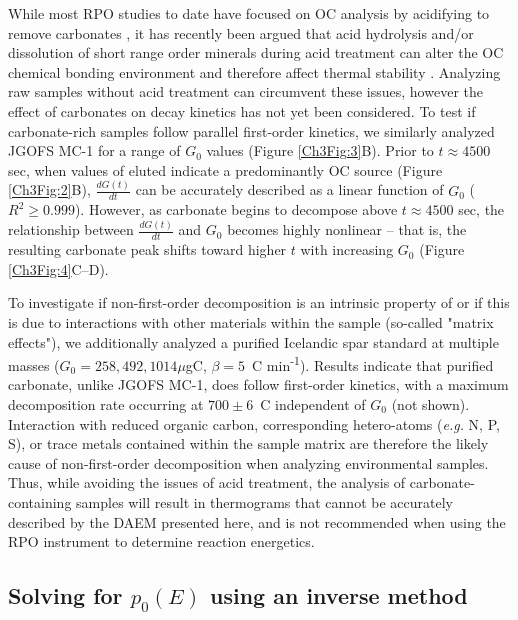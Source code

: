 While most RPO studies to date have focused on OC analysis by acidifying to remove carbonates \citep[\textit{e.g.}][]{Rosenheim:2008ed,Rosenheim:2012kh,Rosenheim:2013dka,Schreiner:2014jr,Bianchi:2015jr}, it has recently been argued that acid hydrolysis and/or dissolution of short range order minerals during acid treatment can alter the OC chemical bonding environment and therefore affect thermal stability \citep{Plante:2013tu}. Analyzing raw samples without acid treatment can circumvent these issues, however the effect of carbonates on decay kinetics has not yet been considered. To test if carbonate-rich samples follow parallel first-order kinetics, we similarly analyzed JGOFS MC-1 for a range of $G_{0}$ values (Figure \ref{Ch3Fig:3}B). Prior to $t \approx 4500$ sec, when  values of eluted  indicate a predominantly OC source (Figure \ref{Ch3Fig:2}B), $\frac{dG(t)}{dt}$ can be accurately described as a linear function of $G_{0}$ ($R^{2} \geq 0.999$). However, as carbonate begins to decompose above $t \approx 4500$ sec, the relationship between $\frac{dG(t)}{dt}$ and $G_{0}$ becomes highly nonlinear -- that is, the resulting carbonate peak shifts toward higher $t$ with increasing $G_{0}$ (Figure \ref{Ch3Fig:4}C--D). 

To investigate if non-first-order decomposition is an intrinsic property of  or if this is due to interactions with other materials within the sample (so-called "matrix effects"), we additionally analyzed a purified Icelandic spar  standard at multiple masses ($G_{0} = 258, 492, 1014 \mu$gC, $\beta = 5$\textdegree\ C min\textsuperscript{-1}). Results indicate that purified carbonate, unlike JGOFS MC-1, does follow first-order kinetics, with a maximum decomposition rate occurring at $700 \pm 6$\textdegree\ C independent of $G_{0}$ (not shown). Interaction with reduced organic carbon, corresponding hetero-atoms (\textit{e.g.} N, P, S), or trace metals contained within the sample matrix are therefore the likely cause of non-first-order  decomposition when analyzing environmental samples. Thus, while avoiding the issues of acid treatment, the analysis of carbonate-containing samples will result in thermograms that cannot be accurately described by the DAEM presented here, and is not recommended when using the RPO instrument to determine reaction energetics.


\subsection{Solving for $p_{0}(E)$ using an inverse method}

